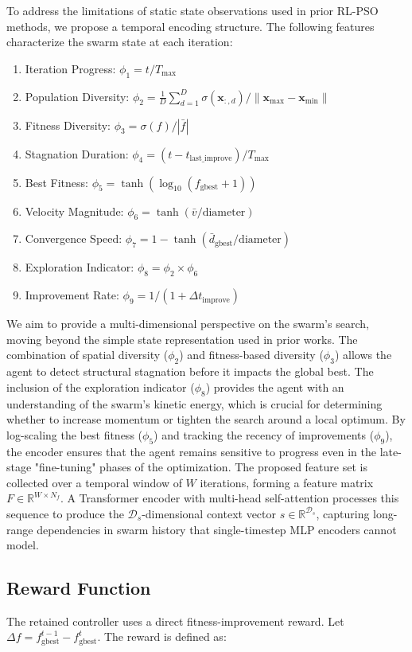 \documentclass[final,5p,times]{elsarticle}
\newcommand{\symStatedim}{\mathcal{D}_s}
\newcommand{\symWindowsize}{W}
\newcommand{\symFeaturecount}{N_f}
\begin{document}
To address the limitations of static state observations used in prior RL-PSO methods, we propose a temporal encoding structure.
The following features characterize the swarm state at each iteration:
\begin{enumerate}
\item Iteration Progress: $\phi_1 = t / T_{\max}$
\item Population Diversity: $\phi_2 = \frac{1}{D} \sum_{d=1}^{D} \sigma(\mathbf{x}_{:,d}) / \|\mathbf{x}_{\max} - \mathbf{x}_{\min}\|$ \item Fitness Diversity: $\phi_3 = \sigma(f) / |\bar{f}|$ \item Stagnation Duration: $\phi_4 = (t - t_{\text{last\_improve}}) / T_{\max}$
\item Best Fitness: $\phi_5 = \tanh(\log_{10}(f_{\text{gbest}} + 1))$ \item Velocity Magnitude: $\phi_6 = \tanh(\bar{v} / \text{diameter})$ \item Convergence Speed: $\phi_7 = 1 - \tanh(\bar{d}_{\text{gbest}} / \text{diameter})$
\item Exploration Indicator: $\phi_8 = \phi_2 \times \phi_6$ \item Improvement Rate: $\phi_9 = 1/(1 + \Delta t_{\text{improve}})$ \end{enumerate} We aim to provide a multi-dimensional perspective on the swarm's search, moving beyond the simple state representation used in prior works. The combination of spatial diversity ($\phi_2$) and fitness-based diversity ($\phi_3$) allows the agent to detect structural stagnation before it impacts the global best. The inclusion of the exploration indicator ($\phi_8$) provides the agent with an understanding of the swarm's kinetic energy, which is crucial for determining whether to increase momentum or tighten the search around a local optimum. By log-scaling the best fitness ($\phi_5$) and tracking the recency of improvements ($\phi_9$), the encoder ensures that the agent remains sensitive to progress even in the late-stage "fine-tuning" phases of the optimization. The proposed feature set is collected over a temporal window of $\symWindowsize$ iterations, forming a feature matrix $F \in \mathbb{R}^{\symWindowsize \times \symFeaturecount}$.
A Transformer encoder \cite{Vaswani2017Attention} with multi-head self-attention processes this sequence to produce the $\symStatedim$-dimensional context vector $s \in \mathbb{R}^{\symStatedim}$, capturing long-range dependencies in swarm history that single-timestep MLP encoders cannot model. \subsection{Reward Function} The retained controller uses a direct fitness-improvement reward. Let $\Delta f = f_{\text{gbest}}^{t-1} - f_{\text{gbest}}^{t}$. The reward is defined as:
\end{document}
